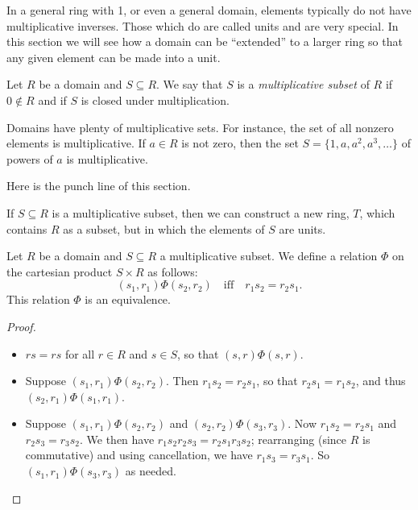 \documentclass{article}
\begin{document}

In a general ring with 1, or even a general domain, elements typically do not have multiplicative inverses. Those which do are called units and are very special. In this section we will see how a domain can be ``extended'' to a larger ring so that any given element can be made into a unit.

\begin{dfn}
Let $R$ be a domain and $S \subseteq R$. We say that $S$ is a \emph{multiplicative subset} of $R$ if $0 \notin R$ and if $S$ is closed under multiplication.
\end{dfn}

Domains have plenty of multiplicative sets. For instance, the set of all nonzero elements is multiplicative. If $a \in R$ is not zero, then the set $S = \{ 1, a, a^2, a^3, \ldots \}$ of powers of $a$ is multiplicative.

Here is the punch line of this section.

\begin{framed}
If $S \subseteq R$ is a multiplicative subset, then we can construct a new ring, $T$, which contains $R$ as a subset, but in which the elements of $S$ are units.
\end{framed}

\begin{prop}
Let $R$ be a domain and $S \subseteq R$ a multiplicative subset. We define a relation $\Phi$ on the cartesian product $S \times R$ as follows: \[ (s_1, r_1) \Phi (s_2, r_2) \quad \mathrm{iff} \quad r_1s_2 = r_2s_1. \]
This relation $\Phi$ is an equivalence.
\end{prop}

\begin{proof} \mbox{}
\begin{itemize}
\item $rs = rs$ for all $r \in R$ and $s \in S$, so that $(s,r) \Phi (s,r)$.
\item Suppose $(s_1,r_1) \Phi (s_2,r_2)$. Then $r_1s_2 = r_2s_1$, so that $r_2s_1 = r_1s_2$, and thus $(s_2,r_1) \Phi (s_1,r_1)$.
\item Suppose $(s_1, r_1) \Phi (s_2, r_2)$ and $(s_2, r_2) \Phi (s_3, r_3)$. Now $r_1s_2 = r_2s_1$ and $r_2s_3 = r_3s_2$. We then have $r_1s_2r_2s_3 = r_2s_1r_3s_2$; rearranging (since $R$ is commutative) and using cancellation, we have $r_1s_3 = r_3s_1$. So $(s_1, r_1) \Phi (s_3, r_3)$ as needed. \qedhere
\end{itemize}
\end{proof}
\end{document}
